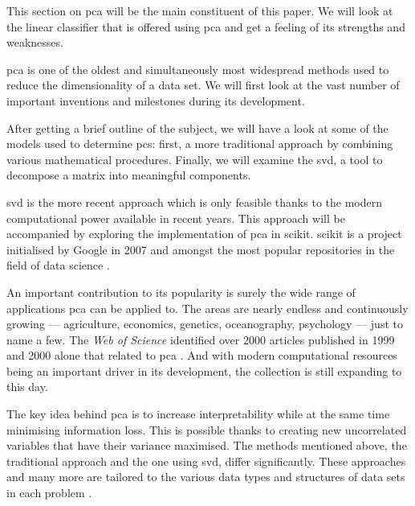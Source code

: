 This section on \gls{pca} will be the main constituent of this paper.
We will look at the linear classifier that is offered using \gls{pca} and get a feeling of its strengths and weaknesses.
\bigskip


\Gls{pca} is one of the oldest and simultaneously most widespread methods used to reduce the dimensionality of a data set.
We will first look at the vast number of important inventions and milestones during its development.

After getting a brief outline of the subject, we will have a look at some of the models used to determine \glspl{pc}: first, a more traditional approach by combining various mathematical procedures. 
Finally, we will examine the \gls{svd}, a tool to decompose a matrix into meaningful components.

\Gls{svd} is the more recent approach which is only feasible thanks to the modern computational power available in recent years.
This approach will be accompanied by exploring the implementation of \gls{pca} in \gls{scikit}.
\Gls{scikit} is a project initialised by Google in 2007 and amongst the most popular repositories in the field of data science \cite{scikit-learn}.
\bigskip


An important contribution to its popularity is surely the wide range of applications \gls{pca} can be applied to.
The areas are nearly endless and continuously growing --- agriculture, economics, genetics, oceanography, psychology --- just to name a few.
The \emph{Web of Science} identified over 2000 articles published in 1999 and 2000 alone that related to \gls{pca} \cite{Jolliffe2002book}.
And with modern computational resources being an important driver in its development, the collection is still expanding to this day.
\bigskip


The key idea behind \gls{pca} is to increase interpretability while at the same time minimising information loss. 
This is possible thanks to creating new uncorrelated variables that have their variance maximised.
The methods mentioned above, the traditional approach and the one using \gls{svd}, differ significantly. 
These approaches and many more are tailored to the various data types and structures of data sets in each problem \cite{jolliffe2016principal}.

